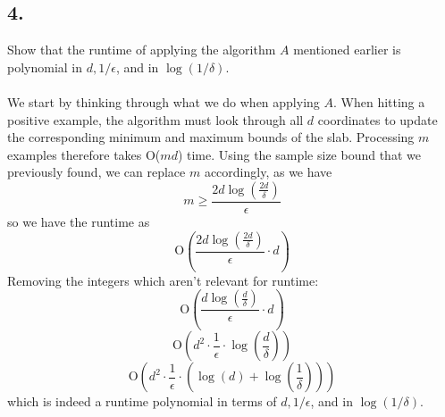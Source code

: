 \documentclass{article}
\begin{document}
{\subsection*{4.}
Show that the runtime of applying the algorithm \(A\) mentioned earlier is polynomial in \(d, 1/\epsilon\), and in \(\log(1/\delta)\). \\ \\
We start by thinking through what we do when applying \(A\). When hitting a positive example, the algorithm must look through all \(d\) coordinates to update the corresponding minimum and maximum bounds of the slab. Processing \(m\) examples therefore takes O(\(md\)) time. Using the sample size bound that we previously found, we can replace \(m\) accordingly, as we have 
\[
  m \geq \frac{2d \log(\frac{2d}{\delta})}{\epsilon}
\] 
so we have the runtime as
\[
  \text{O}(\frac{2d \log(\frac{2d}{\delta})}{\epsilon} \cdot d)
\]
Removing the integers which aren't relevant for runtime:
\[
  \text{O}(\frac{d \log(\frac{d}{\delta})}{\epsilon} \cdot d)
\]
\[
  \text{O}(d^2 \cdot \frac{1}{\epsilon} \cdot \log(\frac{d}{\delta}))
\]
\[
  \boxed{\text{O}(d^2 \cdot \frac{1}{\epsilon} \cdot (\log(d) + \log(\frac{1}{\delta})))}
\]
which is indeed a runtime polynomial in terms of \(d, 1/\epsilon\), and in \(\log(1/\delta)\).

}
\end{document}

